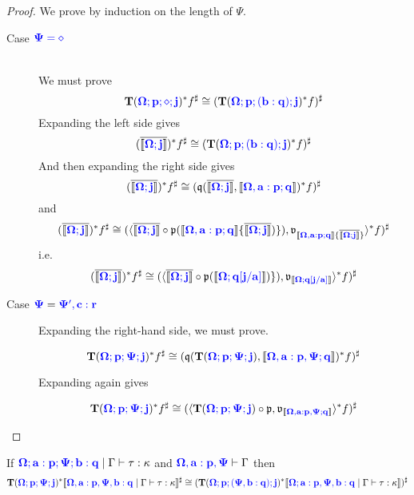 \documentclass[sigplan,10pt,review,anonymous]{acmart}
\newcommand{\blum}[1]{\mathbf{\color{blue}{#1}}}
\newcommand{\sem}[1]{\llbracket #1 \rrbracket}
\newcommand{\mbf}[1]{\mathbf{#1}}
\begin{document}
\begin{proof}
We prove by induction on the length of $\Psi$.

\begin{description}

\item[Case $\blum{\Psi = \diamond}$]~\\
We must prove
$$\mbf{T}(\blum{\Omega;p;\diamond;j})^* f^\sharp \cong (\mbf{T}(\blum{\Omega ; p ; (b : q) ; j})^* f)^\sharp$$
Expanding the left side gives
$$(\overline{\sem{\blum{\Omega;j}}})^* f^\sharp \cong (\mbf{T}(\blum{\Omega ; p ; (b : q) ; j})^* f)^\sharp$$
And then expanding the right side gives
$$(\overline{\sem{\blum{\Omega;j}}})^* f^\sharp \cong (\frak q( \overline{\sem{\blum{\Omega;j}}}, \sem{\blum{\Omega,a:p;q}})^* f)^\sharp$$
and
$$(\overline{\sem{\blum{\Omega;j}}})^* f^\sharp \cong (\langle \overline{\sem{\blum{\Omega;j}}} \circ \frak p(\sem{\blum{\Omega,a:p ; q}} \{ \overline{\sem{\blum{\Omega ; j}}}) \}), \frak v_{\sem{\blum{\Omega,a:p ; q}} \{ \overline{\sem{\blum{\Omega ; j}}} \}} \rangle^* f)^\sharp$$
i.e.
$$(\overline{\sem{\blum{\Omega;j}}})^* f^\sharp \cong (\langle \overline{\sem{\blum{\Omega;j}}} \circ \frak p(\sem{\blum{\Omega ; q[j/a]}}) \}), \frak v_{\sem{\blum{\Omega ; q[j/a]}}} \rangle^* f)^\sharp$$

\item[Case $\blum{\Psi} = \blum{\Psi', c: r}$]
Expanding the right-hand side, we must prove.

$$\mbf{T}(\blum{\Omega; p; \Psi; j})^* f^\sharp \cong (\frak q(\mbf{T}(\blum{\Omega; p ; \Psi; j}), \sem{\blum{\Omega, a:p, \Psi; q}})^* f)^\sharp $$

Expanding again gives

$$\mbf{T}(\blum{\Omega; p; \Psi; j})^* f^\sharp \cong (\langle \mbf{T}(\blum{\Omega; p ; \Psi; j}) \circ \frak p, \frak v_{\sem{\blum{\Omega, a:p, \Psi; q}}} \rangle^* f)^\sharp $$

\end{description}

\end{proof}

\begin{lemma}
If $\blum{\Omega; a :p; \Psi; b : q} \mid \Gamma \vdash \tau : \kappa$ and $\blum{\Omega, a : p, \Psi} \vdash \Gamma$ then $$\mbf{T}(\blum{\Omega; p; \Psi; j})^* \sem{\blum{\Omega, a : p, \Psi, b : q} \mid \Gamma \vdash \tau : \kappa}^\sharp \cong (\mbf{T}(\blum{\Omega; p ; (\Psi, b : q); j})^* \sem{\blum{\Omega ; a : p, \Psi, b : q} \mid \Gamma \vdash \tau : \kappa})^\sharp$$ 
\end{lemma}
\end{document}
